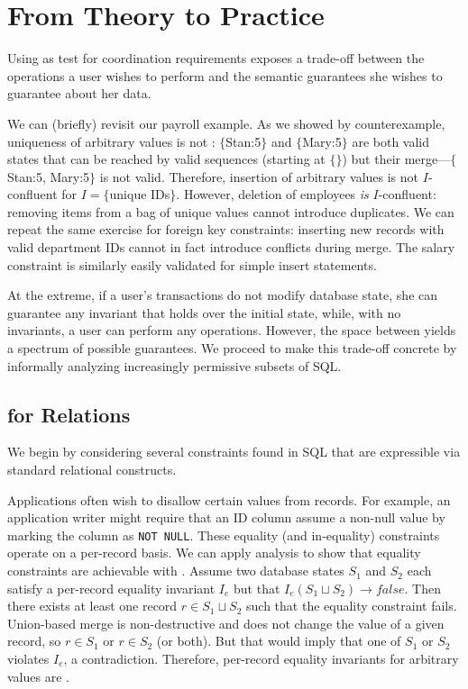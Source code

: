 
\section{From Theory to Practice}
\label{sec:bcc-practice}
\label{sec:merge}

Using \iconfluence as test for coordination requirements exposes a
trade-off between the operations a user wishes to perform and the
semantic guarantees she wishes to guarantee about her data.

 We can (briefly) revisit our payroll
example. As we showed by counterexample, uniqueness of arbitrary
values is not \iconfluent: $\{$Stan:5$\}$ and $\{$Mary:5$\}$ are both
valid states that can be reached by valid sequences (starting at
$\{\}$) but their merge---$\{$Stan:5, Mary:5$\}$ is not
valid. Therefore, insertion of arbitrary values is not $I$-confluent
for $I=\{$unique IDs$\}$. However, deletion of employees \textit{is}
$I$-confluent: removing items from a bag of unique values cannot
introduce duplicates. We can repeat the same exercise for foreign key
constraints: inserting new records with valid department IDs cannot in
fact introduce conflicts during merge. The salary constraint is
similarly easily validated for simple insert statements.

At the extreme, if a user's transactions do not modify database state,
she can guarantee any invariant that holds over the initial state,
while, with no invariants, a user can perform any operations. However,
the space between yields a spectrum of possible \iconfluent
guarantees. We proceed to make this trade-off concrete by informally
analyzing increasingly permissive subsets of SQL.

\subsection{\iconfluence for Relations}

We begin by considering several constraints found in SQL that are
expressible via standard relational constructs.

 Applications often wish to disallow certain values
from records. For example, an application writer might require that an
ID column assume a non-null value by marking the column as \texttt{NOT
  NULL}. These equality (and in-equality) constraints operate on a
per-record basis. We can apply \iconfluence analysis to show that
equality constraints are achievable with \cfreedom. Assume two
database states $S_1$ and $S_2$ each satisfy a per-record equality
invariant $I_e$ but that $I_e(S_1 \sqcup S_2)\rightarrow false$. Then
there exists at least one record $r \in S_1 \sqcup S_2$ such that the
equality constraint fails. Union-based merge is non-destructive and
does not change the value of a given record, so $r \in S_1$ or $r \in
S_2$ (or both). But that would imply that one of $S_1$ or $S_2$
violates $I_e$, a contradiction. Therefore, per-record equality
invariants for arbitrary values are \iconfluent.

